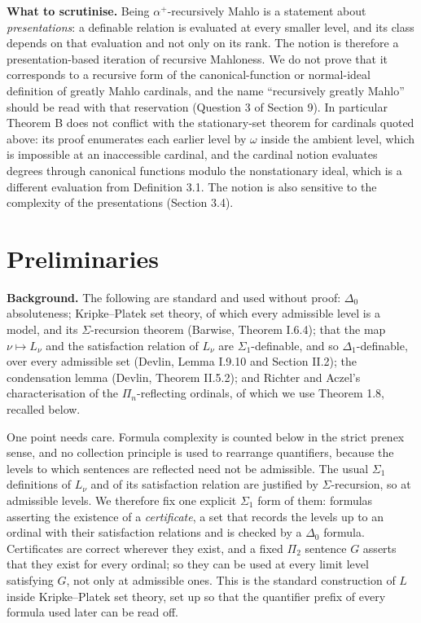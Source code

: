 \documentclass[11pt]{article}
\begin{document}
\textbf{What to scrutinise.} Being $\alpha^+$-recursively Mahlo is a statement about \emph{presentations}: a
definable relation is evaluated at every smaller level, and its class depends on that evaluation and not only on its
rank. The notion is therefore a presentation-based iteration of recursive Mahloness. We do not prove that it corresponds to a recursive form of the
canonical-function or normal-ideal definition of greatly Mahlo cardinals, and the name ``recursively greatly Mahlo''
should be read with that reservation (Question 3 of Section 9). In particular Theorem B does not conflict with the
stationary-set theorem for cardinals quoted above: its proof enumerates each earlier level by $\omega$ inside the
ambient level, which is impossible at an inaccessible cardinal, and the cardinal notion evaluates degrees through
canonical functions modulo the nonstationary ideal, which is a different evaluation from Definition 3.1. The notion
is also sensitive to the complexity of the presentations (Section 3.4).

\section{Preliminaries}

\textbf{Background.} The following are standard and used without proof: $\Delta_0$ absoluteness; Kripke--Platek set
theory, of which every admissible level is a model, and its $\Sigma$-recursion theorem (Barwise, Theorem I.6.4); that the
map $\nu \mapsto L_{\nu}$ and the satisfaction relation of $L_{\nu}$ are $\Sigma_1$-definable, and so
$\Delta_1$-definable, over every admissible set (Devlin, Lemma I.9.10 and Section II.2); the condensation lemma (Devlin,
Theorem II.5.2); and Richter and Aczel's characterisation of the $\Pi_n$-reflecting ordinals, of which we use Theorem 1.8,
recalled below.

One point needs care. Formula complexity is counted below in the strict prenex sense, and no collection principle is
used to rearrange quantifiers, because the levels to which sentences are reflected need not be admissible. The usual
$\Sigma_1$ definitions of $L_{\nu}$ and of its satisfaction relation are justified by $\Sigma$-recursion, so at
admissible levels. We therefore
fix one explicit $\Sigma_1$ form of them: formulas asserting the existence of a \emph{certificate}, a set that records
the levels up to an ordinal with their satisfaction relations and is checked by a $\Delta_0$ formula. Certificates
are correct wherever they exist, and a fixed $\Pi_2$ sentence $G$ asserts that they exist for every ordinal; so they
can be used at every limit level satisfying $G$, not only at admissible ones. This is the standard construction of
$L$ inside Kripke--Platek set theory, set up so that the quantifier prefix of every formula used later can be read
off.
\end{document}

